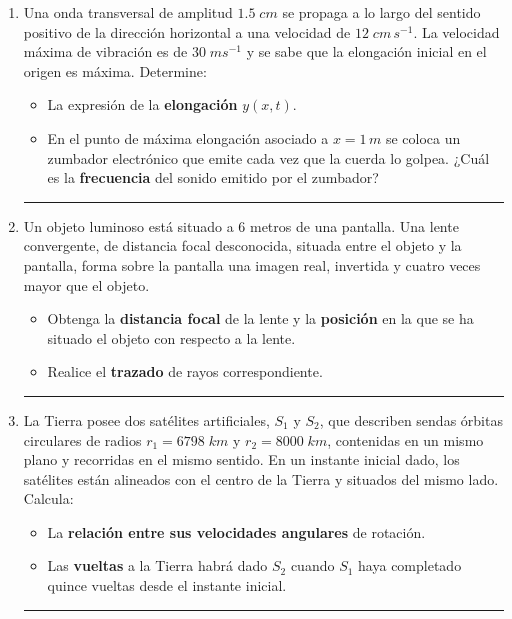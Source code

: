 \documentclass[a4paper,12pt]{exam}
\newcommand{\halmos}{\vspace*{-7mm}
	
					\begin{flushright}
						\rule{1mm}{2.5mm} 
					\end{flushright}\vspace*{-6mm}
						
					  }
\renewcommand{\qed}{\halmos}
\begin{document}
\newpage
{}

\vspace*{.1cm}


\begin{enumerate}


	\item Una onda transversal de amplitud $1.5\;cm$ se propaga a lo largo del sentido positivo de la dirección horizontal a una velocidad de $12\;cm\,s^{-1}$. La velocidad máxima de vibración es de $30\;m s^{-1}$ y se sabe que la elongación inicial en el origen es máxima. Determine:
	\begin{itemize}
		\item[a)]  La expresión de la \textbf{elongación} $y(x,t)$.
		\item[b)]  En el punto de máxima elongación asociado a $x=1\,m$ se coloca un zumbador electrónico que emite cada vez que la cuerda lo golpea. ¿Cuál es la \textbf{frecuencia} del sonido emitido por el zumbador?
	\end{itemize}
	\qed
			

		\item Un objeto luminoso está situado a $6$ metros de una pantalla. Una lente convergente, de  distancia  focal  desconocida,  situada  entre  el  objeto  y  la  pantalla,  forma  sobre  la  pantalla  una  imagen real, invertida y cuatro veces mayor que el objeto.
	\begin{itemize}
		\item[a)] Obtenga la \textbf{distancia focal} de la lente y la \textbf{posición} en la que se ha situado el objeto con respecto a la lente.
		\item[b)] Realice el \textbf{trazado} de rayos correspondiente.
	\end{itemize}
	\qed	
	
		
	



	\item La  Tierra posee dos satélites artificiales, $S_1$ y $S_2$, que describen sendas órbitas circulares de radios $r_1=6798 \;km$ y $r_2=8000\;km$, contenidas en un mismo plano y recorridas en el mismo sentido. En un instante inicial dado, los satélites están alineados con el centro de la Tierra y situados del mismo lado. Calcula:
 		\begin{itemize}
 			\item[a)] La \textbf{relación entre sus velocidades angulares} de rotación.
 			\item[b)] Las \textbf{vueltas} a la Tierra habrá dado $S_2$ cuando $S_1$ haya completado quince vueltas desde el instante inicial.
 		\end{itemize}
 		\qed
 		

\end{enumerate}
\end{document}
